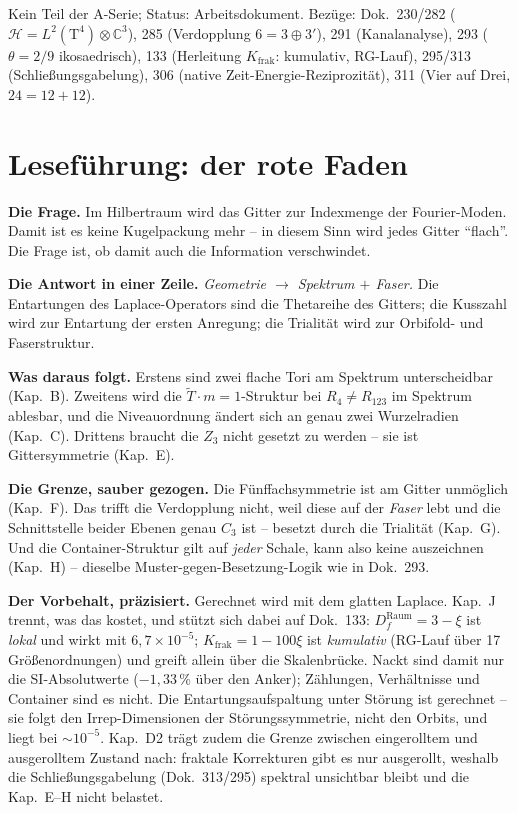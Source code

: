 Kein Teil der A-Serie; Status: Arbeitsdokument. Bezüge: Dok.~230/282
($\mathcal{H} = L^2(\text{T}^4)\otimes\mathbb{C}^3$), 285
(Verdopplung $6 = 3\oplus3'$), 291 (Kanalanalyse), 293
($\theta = 2/9$ ikosaedrisch), 133 (Herleitung $K_\text{frak}$: kumulativ, RG-Lauf),
295/313 (Schließungsgabelung), 306 (native
Zeit-Energie-Reziprozität), 311 (Vier auf Drei, $24 = 12+12$).

\section*{Leseführung: der rote Faden}

\textbf{Die Frage.} Im Hilbertraum wird das Gitter zur Indexmenge
der Fourier-Moden. Damit ist es keine Kugelpackung mehr -- in diesem
Sinn wird jedes Gitter \enquote{flach}. Die Frage ist, ob damit auch
die Information verschwindet.

\textbf{Die Antwort in einer Zeile.} \emph{Geometrie $\to$ Spektrum
$+$ Faser.} Die Entartungen des Laplace-Operators sind die
Thetareihe des Gitters; die Kusszahl wird zur Entartung der ersten
Anregung; die Trialität wird zur Orbifold- und Faserstruktur.

\textbf{Was daraus folgt.} Erstens sind zwei flache Tori am
Spektrum unterscheidbar (Kap.~B). Zweitens wird die
$\tilde T\cdot m = 1$-Struktur bei $R_4 \ne R_{123}$ im Spektrum
ablesbar, und die Niveauordnung ändert sich an genau zwei
Wurzelradien (Kap.~C). Drittens braucht die $Z_3$ nicht gesetzt zu
werden -- sie ist Gittersymmetrie (Kap.~E).

\textbf{Die Grenze, sauber gezogen.} Die Fünffachsymmetrie ist am
Gitter unmöglich (Kap.~F). Das trifft die Verdopplung nicht, weil
diese auf der \emph{Faser} lebt und die Schnittstelle beider Ebenen
genau $C_3$ ist -- besetzt durch die Trialität (Kap.~G). Und die
Container-Struktur gilt auf \emph{jeder} Schale, kann also keine
auszeichnen (Kap.~H) -- dieselbe Muster-gegen-Besetzung-Logik wie in
Dok.~293.

\textbf{Der Vorbehalt, präzisiert.} Gerechnet wird mit dem glatten
Laplace. Kap.~J trennt, was das kostet, und stützt sich dabei auf
Dok.~133: $D_f^\text{Raum} = 3-\xi$ ist \emph{lokal} und wirkt mit
$6{,}7\times10^{-5}$; $K_\text{frak} = 1-100\xi$ ist
\emph{kumulativ} (RG-Lauf über 17 Größenordnungen) und greift
allein über die Skalenbrücke. Nackt sind damit nur die
SI-Absolutwerte ($-1{,}33\,\%$ über den Anker); Zählungen,
Verhältnisse und Container sind es nicht. Die Entartungsaufspaltung
unter Störung ist gerechnet -- sie folgt den Irrep-Dimensionen der
Störungssymmetrie, nicht den Orbits, und liegt bei $\sim10^{-5}$. Kap.~D2 trägt zudem die Grenze zwischen eingerolltem und
ausgerolltem Zustand nach: fraktale Korrekturen gibt es nur
ausgerollt, weshalb die Schließungsgabelung (Dok.~313/295)
spektral unsichtbar bleibt und die Kap.~E--H nicht belastet.

